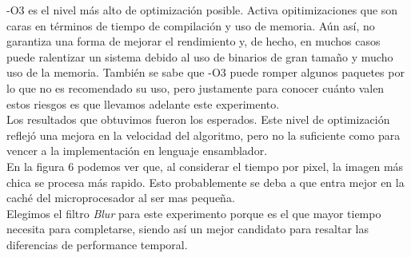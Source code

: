 \documentclass[10pt,a4paper,spanish]{article}
\begin{document}
-O3 es el nivel más alto de optimización posible. Activa opitimizaciones que son caras en términos de tiempo de compilación y uso de memoria. Aún así, no garantiza una forma de mejorar el rendimiento y, de hecho, en muchos casos puede ralentizar un sistema debido al uso de binarios de gran tamaño y mucho uso de la memoria. También se sabe que -O3 puede romper algunos paquetes por lo que no es recomendado su uso, pero justamente para conocer cuánto valen estos riesgos es que llevamos adelante este experimento. \\

Los resultados que obtuvimos fueron los esperados. Este nivel de optimización reflejó una mejora en la velocidad del algoritmo, pero no la suficiente como para vencer a la implementación en lenguaje ensamblador. \\

En la figura 6 podemos ver que, al considerar el tiempo por pixel, la imagen más chica se procesa más rapido. Esto probablemente se deba a que entra mejor en la caché del microprocesador al ser mas pequeña. \\

Elegimos el filtro \textit{Blur} para este experimento porque es el que mayor tiempo necesita para completarse, siendo así un mejor candidato para resaltar las diferencias de performance temporal. \\
\begin{center}
\end{center}
\end{document}
